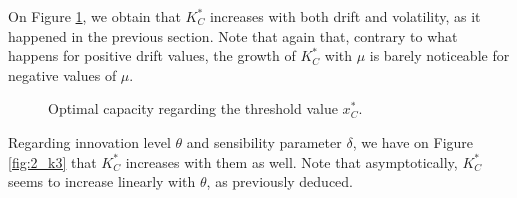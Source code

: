 On Figure \ref{fig:2_k1}, we obtain that $K^*_C$ increases with both drift and volatility, as it happened in the previous section. Note that again that, contrary to what happens for positive drift values, the growth of $K^*_C$ with $\mu$ is barely noticeable for negative values of $\mu$.

\begin{figure}[!htb]
	\begin{subfigmatrix}{2}
	\end{subfigmatrix}
	\caption{Optimal capacity regarding the threshold value $x^*_C$.}
	\label{fig:2_k1}
\end{figure}

Regarding innovation level $\theta$ and sensibility parameter $\delta$, we have on Figure \ref{fig:2_k3} that $K^*_C$ increases with them as well. Note that asymptotically, $K^*_C$ seems to increase linearly with $\theta$, as previously deduced.

